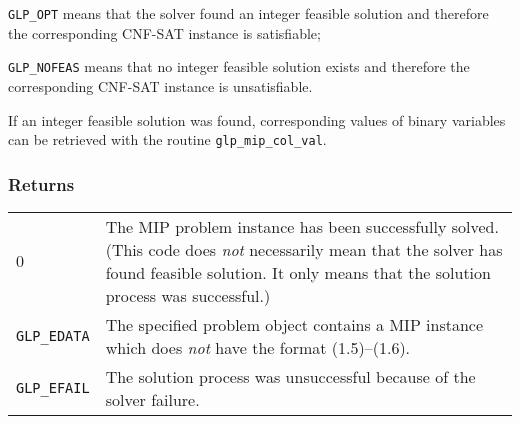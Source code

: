 \documentclass[11pt,draft]{article}
\begin{document}
\verb|GLP_OPT| means that the solver found an integer feasible
solution and therefore the corresponding CNF-SAT instance is
satisfiable;

\verb|GLP_NOFEAS| means that no integer feasible solution exists and
therefore the corresponding CNF-SAT instance is unsatisfiable.

If an integer feasible solution was found, corresponding values of
binary variables can be retrieved with the routine
\verb|glp_mip_col_val|.

\subsubsection*{Returns}

\begin{tabular}{@{}p{25mm}p{97.3mm}@{}}
0 & The MIP problem instance has been successfully solved. (This code
does {\it not} necessarily mean that the solver has found feasible
solution. It only means that the solution process was successful.)\\
\verb|GLP_EDATA| & The specified problem object contains a MIP instance
which does {\it not} have the format (1.5)--(1.6).\\
\verb|GLP_EFAIL| & The solution process was unsuccessful because of the
solver failure.\\
\end{tabular}
\end{document}
